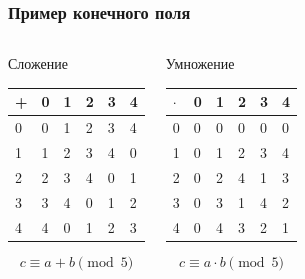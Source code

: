 \begin{frame}
    \frametitle{Пример конечного поля}
    
    \begin{columns}
        \begin{block}{Сложение}
            \begin{table}[ht]
                \label{t:fieldAddDgt}
                \centering
                \begin{tabular}[c]{|l||l|l|l|l|l|}
                    \hline
                    +& 0& 1& 2& 3& 4\\ \hline\hline 
                    0& 0& 1& 2& 3& 4\\ \hline 
                    1& 1& 2& 3& 4& 0\\ \hline 
                    2& 2& 3& 4& 0& 1\\ \hline 
                    3& 3& 4& 0& 1& 2\\ \hline 
                    4& 4& 0& 1& 2& 3\\ \hline 
                \end{tabular}
            \end{table}
            \[c\equiv a+b \pmod{5}\]
        \end{block}
        
        \begin{block}{Умножение}
            \begin{table}[ht]
                \label{t:fieldMulDgt}
                \centering
                \begin{tabular}[c]{|l||l|l|l|l|l|}
                    \hline
                    $\cdot$ & 0& 1& 2& 3& 4\\ \hline\hline
                    0       & 0& 0& 0& 0& 0\\ \hline 
                    1       & 0& 1& 2& 3& 4\\ \hline 
                    2       & 0& 2& 4& 1& 3\\ \hline 
                    3       & 0& 3& 1& 4& 2\\ \hline 
                    4       & 0& 4& 3& 2& 1\\ \hline 
                \end{tabular}
            \end{table}
            \[c\equiv a\cdot b \pmod{5}\]
        \end{block}
    \end{columns}
\end{frame}


